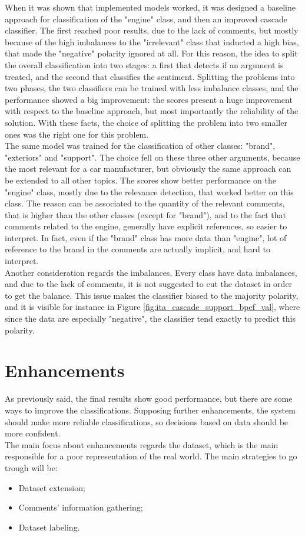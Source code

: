 When it was shown that implemented models worked, it was designed a baseline approach for classification of the "engine" class, and then an improved cascade classifier. The first reached poor results, due to the lack of comments, but mostly because of the high imbalances to the "irrelevant" class that inducted a high bias, that made the "negative" polarity ignored at all. For this reason, the idea to split the overall classification into two stages: a first that detects if an argument is treated, and the second that classifies the sentiment. Splitting the problems into two phases, the two classifiers can be trained with less imbalance classes, and the performance showed a big improvement: the scores present a huge improvement with respect to the baseline approach, but most importantly the reliability of the solution. With these facts, the choice of splitting the problem into two smaller ones was the right one for this problem.\\
The same model was trained for the classification of other classes: "brand", "exteriors" and "support". The choice fell on these three other arguments, because the most relevant for a car manufacturer, but obviously the same approach can be extended to all other topics. The scores show better performance on the "engine" class, mostly due to the relevance detection, that worked better on this class. The reason can be associated to the quantity of the relevant comments, that is higher than the other classes (except for "brand"), and to the fact that comments related to the engine, generally have explicit references, so easier to interpret. In fact, even if the "brand" class has more data than "engine", lot of reference to the brand in the comments are actually implicit, and hard to interpret.\\
Another consideration regards the imbalances. Every class have data imbalances, and due to the lack of comments, it is not suggested to cut the dataset in order to get the balance. This issue makes the classifier biased to the majority polarity, and it is visible for instance in Figure \ref{fig:ita_cascade_support_bpef_val}, where since the data are especially "negative", the classifier tend exactly to predict this polarity.


\section{Enhancements}

As previously said, the final results show good performance, but there are some ways to improve the classifications. Supposing further enhancements, the system should make more reliable classifications, so decisions based on data should be more confident.\\
The main focus about enhancements regards the dataset, which is the main responsible for a poor representation of the real world. The main strategies to go trough will be:
\begin{itemize}
	\item Dataset extension;
	\item Comments' information gathering;
	\item Dataset labeling.
\end{itemize}

